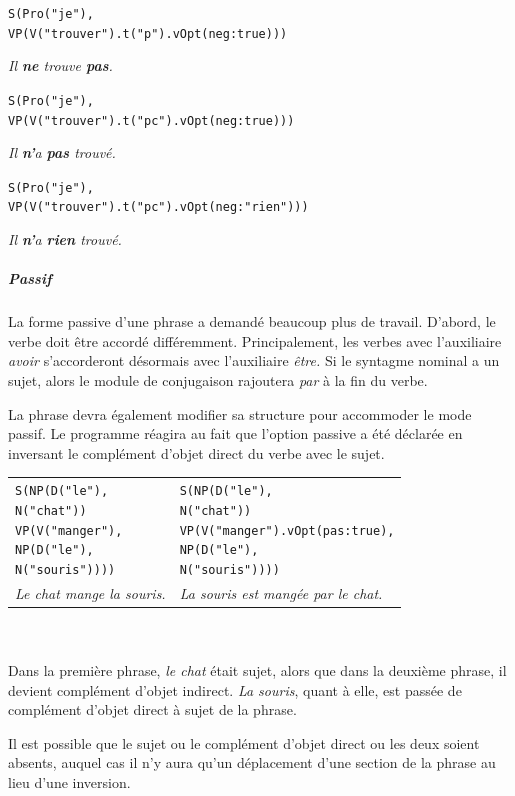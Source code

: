 \documentclass[11pt]{article} %
\newcommand{\real}[1]{\emph{#1}}
\begin{document}
\begin{alltt}
S(Pro("je"),
  VP(V("trouver").t("p").vOpt({neg:true})))
\end{alltt}
\real{Il \textbf{ne} trouve \textbf{pas}.}\\

\begin{alltt}
S(Pro("je"),
  VP(V("trouver").t("pc").vOpt({neg:true})))
\end{alltt}
\real{Il \textbf{n'}a \textbf{pas} trouvé.}\\

\begin{alltt}
S(Pro("je"),
  VP(V("trouver").t("pc").vOpt({neg:"rien"})))
\end{alltt}
\real{Il \textbf{n'}a \textbf{rien} trouvé.}\\

\subparagraph{Passif}

La forme passive d'une phrase a demandé beaucoup plus de travail.
D'abord, le verbe doit être accordé différemment. Principalement,
les verbes avec l'auxiliaire \emph{avoir} s'accorderont désormais
avec l'auxiliaire \emph{être.} Si le syntagme nominal
a un sujet, alors le module de conjugaison rajoutera \emph{par}
à la fin du verbe.

La phrase devra également modifier sa
structure pour accommoder le mode passif. Le programme réagira au
fait que l'option passive a été déclarée en inversant le complément
d'objet direct du verbe avec le sujet. \\
\begin{tabular}{p{7cm} p{7cm}}
\begin{alltt}
S(NP(D("le"),
     N("chat"))
  VP(V("manger"),
     NP(D("le"),
        N("souris"))))
\end{alltt} &
\begin{alltt}
S(NP(D("le"),
     N("chat"))
  VP(V("manger").vOpt({pas:true}),
     NP(D("le"),
        N("souris"))))
\end{alltt}
\\
\real{Le chat mange la souris.} & \real{La souris est mangée par le chat.}
\end{tabular}\\
\\
Dans la première phrase, \emph{le chat} était sujet, alors que dans la
deuxième phrase, il devient complément d'objet indirect. \emph{La souris}, quant à elle, 
est passée de complément d'objet direct à sujet de la phrase.

Il est possible que le sujet ou le complément d'objet direct ou les deux soient absents, auquel cas
il n'y aura qu'un déplacement d'une section de la phrase au lieu d'une
inversion. 
\end{document}
